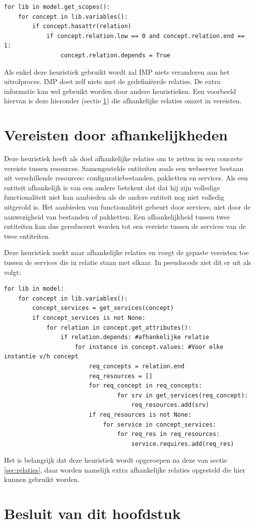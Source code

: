 \begin{minipage}{\textwidth}
\begin{lstlisting}
for lib in model.get_scopes():
    for concept in lib.variables():
        if concept.hasattr(relation)
            if concept.relation.low == 0 and concept.relation.end == 1:
                concept.relation.depends = True
\end{lstlisting}
\end{minipage}

Als enkel deze heuristiek gebruikt wordt zal IMP niets veranderen aan het uitrolproces.
IMP doet zelf niets met de gedefini\"eerde relaties.
De extra informatie kan wel gebruikt worden door andere heuristieken.
Een voorbeeld hiervan is deze hieronder (sectie \ref{sec:vereisten_uit_afhankelijkheden}) die afhankelijke relaties omzet in vereisten.

\section{Vereisten door afhankelijkheden}
\label{sec:vereisten_uit_afhankelijkheden}
Deze heuristiek heeft als doel afhankelijke relaties om te zetten in een concrete vereiste tussen resources.
Samengestelde entiteiten zoals een webserver bestaan uit verschillende resources: configuratiebestanden, pakketten en services.
Als een entiteit afhankelijk is van een andere betekent dat dat hij zijn volledige functionaliteit niet kan aanbieden als de andere entiteit nog niet volledig uitgerold is.
Het aanbieden van functionaliteit gebeurt door services, niet door de aanwezigheid van bestanden of pakketten.
Een afhankelijkheid tussen twee entiteiten kan dus gereduceert worden tot een vereiste tussen de services van de twee entiteiten.

Deze heuristiek zoekt naar afhankelijke relaties en voegt de gepaste vereisten toe tussen de services die in relatie staan met elkaar.
In pseudocode ziet dit er uit als volgt:

\begin{minipage}{\textwidth}
\begin{lstlisting}
for lib in model:
    for concept in lib.variables():
        concept_services = get_services(concept)
        if concept_services is not None:
            for relation in concept.get_attributes():
                if relation.depends: #afhankelijke relatie
                    for instance in concept.values: #Voor elke instantie v/h concept
                        req_concepts = relation.end
                        req_resources = []
                        for req_concept in req_concepts:
                                for srv in get_services(req_concept):
                                    req_resources.add(srv)
                        if req_resources is not None: 
                            for service in concept_services:
                                for req_res in req_resources:
                                    service.requires.add(req_res)
\end{lstlisting}
\end{minipage}

Het is belangrijk dat deze heuristiek wordt opgeroepen na deze van sectie \ref{sec:relaties}, daar worden namelijk extra afhankelijke relaties opgesteld die hier kunnen gebruikt worden.

\section{Besluit van dit hoofdstuk}


